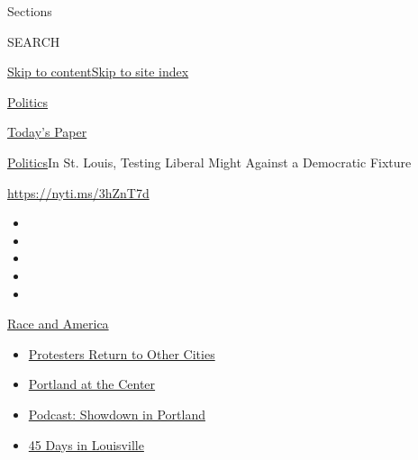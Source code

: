 Sections

SEARCH

\protect\hyperlink{site-content}{Skip to
content}\protect\hyperlink{site-index}{Skip to site index}

\href{https://www.nytimes.com/section/politics}{Politics}

\href{https://myaccount.nytimes.com/auth/login?response_type=cookie\&client_id=vi}{}

\href{https://www.nytimes.com/section/todayspaper}{Today's Paper}

\href{/section/politics}{Politics}\textbar{}In St. Louis, Testing
Liberal Might Against a Democratic Fixture

\url{https://nyti.ms/3hZnT7d}

\begin{itemize}
\item
\item
\item
\item
\item
\end{itemize}

\href{https://www.nytimes.com/news-event/george-floyd-protests-minneapolis-new-york-los-angeles?action=click\&pgtype=Article\&state=default\&region=TOP_BANNER\&context=storylines_menu}{Race
and America}

\begin{itemize}
\tightlist
\item
  \href{https://www.nytimes.com/2020/07/26/us/protests-portland-seattle-trump.html?action=click\&pgtype=Article\&state=default\&region=TOP_BANNER\&context=storylines_menu}{Protesters
  Return to Other Cities}
\item
  \href{https://www.nytimes.com/2020/07/24/us/portland-oregon-protests-white-race.html?action=click\&pgtype=Article\&state=default\&region=TOP_BANNER\&context=storylines_menu}{Portland
  at the Center}
\item
  \href{https://www.nytimes.com/2020/07/23/podcasts/the-daily/portland-protests.html?action=click\&pgtype=Article\&state=default\&region=TOP_BANNER\&context=storylines_menu}{Podcast:
  Showdown in Portland}
\item
  \href{https://www.nytimes.com/interactive/2020/07/16/us/black-lives-matter-protests-louisville-breonna-taylor.html?action=click\&pgtype=Article\&state=default\&region=TOP_BANNER\&context=storylines_menu}{45
  Days in Louisville}
\end{itemize}

